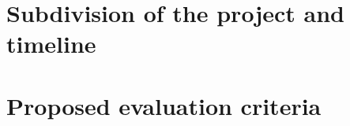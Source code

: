 \documentclass[12pt, a4paper]{article}
\begin{document}
\section{Subdivision of the project and timeline}\label{sec:subdivision-of-the-project-and-timeline}


\section{Proposed evaluation criteria}\label{sec:proposed-evaluation-criteria}




\end{document}
